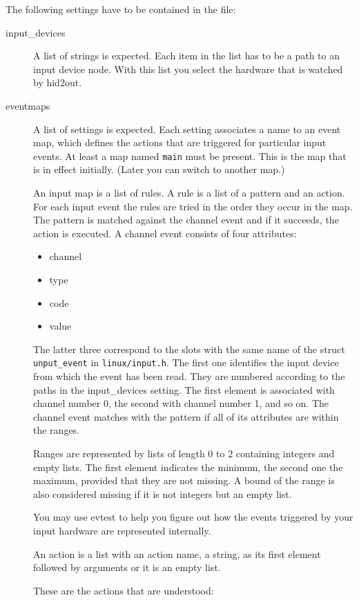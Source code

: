 The following settings have to be contained in the  file:
\begin{description}
\item[input\_devices]
  A list of strings is expected. Each item in the list 
  has to be a path to an input device node.
  With this list you select the hardware that is watched by
  hid2out.
\item[eventmaps]
  A list of settings is expected.
  Each setting associates a name to an event map, which
  defines the actions that are triggered for particular input events.
  At least a map named \texttt{main} must be present.
  This is the map that is in effect initially.
  (Later you can switch to another map.)

  An input map is a list of rules.
  A rule is a list of a pattern and an action.
  For each input event the rules are tried in the order they occur in the map.
  The pattern is matched against the channel event and if it succeeds, the 
  action is executed.
  A channel event consists of four attributes:
  \begin{itemize}
  \item channel
  \item type
  \item code
  \item value
  \end{itemize}
  The latter three correspond to the slots with the same name of 
  the struct \texttt{unput\_event} in \texttt{linux/input.h}.
  The first one identifies the input device from which the event has been
  read. They are numbered according to the paths in the input\_devices setting.
  The first element is associated with channel number 0, the second with channel
  number 1, and so on.
  The channel event matches with the pattern if all of its attributes
  are within the ranges.
  
  Ranges are represented by lists of length 0 to 2
  containing integers and empty lists.
  The first element indicates the minimum,
  the second one the maximum, provided that they are not missing.
  A bound of the range is also considered missing if it is not integers but 
  an empty list.

  You may use evtest to help you figure out how the events 
  triggered by your input hardware 
  are represented internally.

  An action is a list with an action name, a string, 
  as its first element followed by arguments or
  it is an empty list.
 
  These are the actions that are understood:


\end{description}
